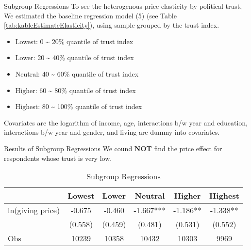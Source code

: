 \documentclass[
  ignorenonframetext,
]{beamer}
\providecommand{\tightlist}{%
  \setlength{\itemsep}{0pt}\setlength{\parskip}{0pt}}
\begin{document}
\begin{frame}{Subgroup Regressions}
\protect\hypertarget{subgroup-regressions}{}
To see the heterogenous price elasticity by political trust, We
estimated the baseline regression model (5) (see Table
\ref{tab:kableEstimateElasticity}), using sample grouped by the trust
index.

\begin{itemize}
\tightlist
\item
  Lowest: 0 \textasciitilde{} 20\% quantile of trust index
\item
  Lower: 20 \textasciitilde{} 40\% quantile of trust index
\item
  Neutral: 40 \textasciitilde{} 60\% quantile of trust index
\item
  Higher: 60 \textasciitilde{} 80\% quantile of trust index
\item
  Highest: 80 \textasciitilde{} 100\% quantile of trust index
\end{itemize}

Covariates are the logarithm of income, age, interactions b/w year and
education, interactions b/w year and gender, and living are dummy into
covariates.
\end{frame}

\begin{frame}{Results of Subgroup Regressions}
\protect\hypertarget{results-of-subgroup-regressions}{}
We cound \textbf{NOT} find the price effect for respondents whose trust
is very low.

\begin{table}

\caption{\label{tab:kableEstimateElasticityByTrustGroup}Subgroup Regressions}
\centering
\fontsize{9}{11}\selectfont
\begin{tabular}[t]{lccccc}
\toprule
 & Lowest & Lower & Neutral & Higher & Highest\\
\midrule
ln(giving price) & -0.675 & -0.460 & -1.667*** & -1.186** & -1.338**\\
 & (0.558) & (0.459) & (0.481) & (0.531) & (0.552)\\
Obs & 10239 & 10358 & 10432 & 10303 & 9969\\
\bottomrule
\end{tabular}
\end{table}
\end{frame}
\end{document}
